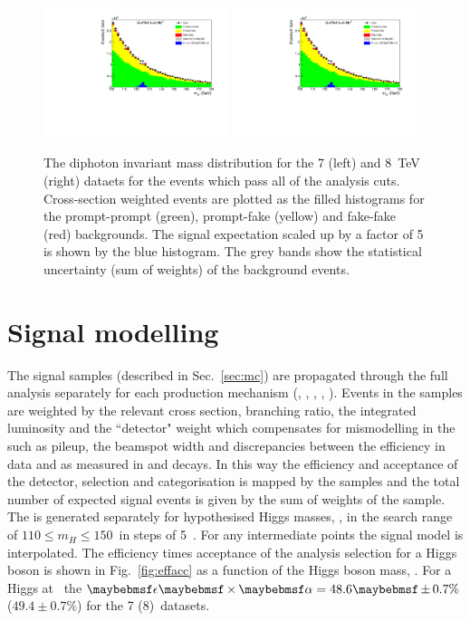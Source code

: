 \begin{figure}
  \includegraphics[width=0.48\textwidth]{analysis/plots/mgg_bkg_7TeV.pdf}
  \includegraphics[width=0.48\textwidth]{analysis/plots/mgg_bkg_8TeV.pdf}
  \caption[Diphoton invariant mass distributions for the datasets at 7 and 8~TeV]{The diphoton invariant mass distribution for the 7 (left) and 8~TeV (right) dataets for the events which pass all of the analysis cuts. Cross-section weighted \MC events are plotted as the filled histograms for the prompt-prompt (green), prompt-fake (yellow) and fake-fake (red) backgrounds. The \SM signal expectation scaled up by a factor of 5 is shown by the blue histogram. The grey bands show the statistical uncertainty (sum of weights) of the background \MC events.}
  \label{fig:inv_mass_plots}
\end{figure}

\section{Signal modelling}
\label{sec:signal_model}

The signal \MC samples (described in Sec.~\ref{sec:mc}) are propagated through the full analysis separately for each production mechanism (\ggH, \VBF, \WH, \ZH, \ttH). Events in the samples are weighted by the relevant \SM cross section, branching ratio, the integrated luminosity and the ``detector" weight which compensates for mismodelling in the \MC such as pileup, the beamspot width and discrepancies between the efficiency in data and \MC as measured in \Zee and \Zmumugamma decays. In this way the efficiency and acceptance of the detector, selection and categorisation is mapped by the \MC samples and the total number of expected \SM signal events is given by the sum of weights of the sample. The \MC is generated separately for hypothesised Higgs masses, \mH, in the search range of $110 \leq m_{H} \leq 150$~\GeV in steps of 5~\GeV. For any intermediate points the signal model is interpolated. The efficiency times acceptance of the analysis selection for a \SM Higgs boson is shown in Fig.~\ref{fig:effacc} as a function of the Higgs boson mass, \mH. For a Higgs at ~\GeV the $\ea=48.6\pm 0.7\%$ ($49.4\pm 0.7\%$) for the 7 (8)~\TeV datasets.

